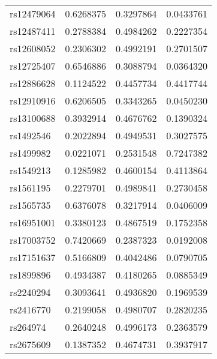 \documentclass[
]{article}
\theoremstyle{plain}
\begin{document}
\begin{table}[H]
\begin{minipage}{0.5\linewidth}
\begin{table}[H]
\begin{tabular}{lrrr}
rs12479064 & 0.6268375 & 0.3297864 & 0.0433761\\
rs12487411 & 0.2788384 & 0.4984262 & 0.2227354\\
rs12608052 & 0.2306302 & 0.4992191 & 0.2701507\\
\addlinespace
rs12725407 & 0.6546886 & 0.3088794 & 0.0364320\\
rs12886628 & 0.1124522 & 0.4457734 & 0.4417744\\
rs12910916 & 0.6206505 & 0.3343265 & 0.0450230\\
rs13100688 & 0.3932914 & 0.4676762 & 0.1390324\\
rs1492546 & 0.2022894 & 0.4949531 & 0.3027575\\
\addlinespace
rs1499982 & 0.0221071 & 0.2531548 & 0.7247382\\
rs1549213 & 0.1285982 & 0.4600154 & 0.4113864\\
rs1561195 & 0.2279701 & 0.4989841 & 0.2730458\\
rs1565735 & 0.6376078 & 0.3217914 & 0.0406009\\
rs16951001 & 0.3380123 & 0.4867519 & 0.1752358\\
\addlinespace
rs17003752 & 0.7420669 & 0.2387323 & 0.0192008\\
rs17151637 & 0.5166809 & 0.4042486 & 0.0790705\\
rs1899896 & 0.4934387 & 0.4180265 & 0.0885349\\
rs2240294 & 0.3093641 & 0.4936820 & 0.1969539\\
rs2416770 & 0.2199058 & 0.4980707 & 0.2820235\\
\addlinespace
rs264974 & 0.2640248 & 0.4996173 & 0.2363579\\
rs2675609 & 0.1387352 & 0.4674731 & 0.3937917\\
\bottomrule
\end{tabular}
\end{table}



\end{minipage}
\end{table}
\end{document}
